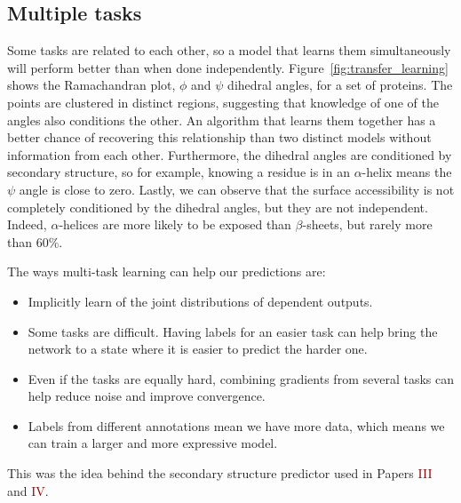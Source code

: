\subsection{Multiple tasks}
Some tasks are related to each other, so a model that learns them simultaneously will perform better than when done independently.
Figure~\ref{fig:transfer_learning} shows the Ramachandran plot,  $\phi$ and $\psi$ dihedral angles, for a set of proteins.
The points are clustered in distinct regions, suggesting that knowledge of one of the angles also conditions the other.
An algorithm that learns them together has a better chance of recovering this relationship than two distinct models without information from each other.
Furthermore, the dihedral angles are conditioned by secondary structure, so for example, knowing a residue is in an $\alpha$-helix means the $\psi$ angle is close to zero.
Lastly, we can observe that the surface accessibility is not completely conditioned by the dihedral angles, but they are not independent.
Indeed, $\alpha$-helices are more likely to be exposed than $\beta$-sheets, but rarely more than 60\%.

The ways multi-task learning  can help our predictions are:
\begin{itemize}
	\item Implicitly learn of the joint distributions of dependent outputs.
	\item Some tasks are difficult.
	Having labels for an easier task can help bring the network to a state where it is easier to predict the harder one.
	\item Even if the tasks are equally hard, combining gradients from several tasks can help reduce noise and improve convergence.
	\item Labels from different annotations mean we have more data, which means we can train a larger and more expressive model.
\end{itemize}

This was the idea behind the secondary structure predictor used in Papers \textcolor{Maroon}{III} and \textcolor{Maroon}{IV}.

